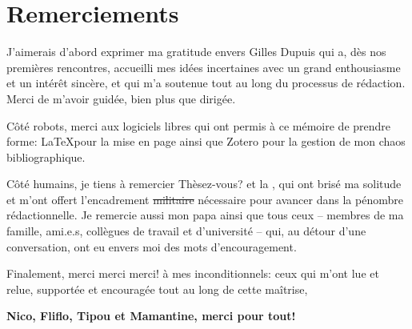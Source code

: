 \chapter*{Remerciements}
J'aimerais d'abord exprimer ma gratitude envers Gilles Dupuis qui a, dès nos premières rencontres, accueilli mes idées incertaines avec un grand enthousiasme et un intérêt sincère, et qui m'a soutenue tout au long du processus de rédaction. Merci de m'avoir guidée, bien plus que dirigée.
\par
Côté robots, merci aux logiciels libres qui ont permis à ce mémoire de prendre forme: \LaTeX pour la mise en page ainsi que Zotero pour la gestion de mon chaos bibliographique.
\par
Côté humains, je tiens à remercier Thèsez-vous? et la , qui ont brisé ma solitude et m'ont offert l'encadrement \sout{militaire} nécessaire pour avancer dans la pénombre rédactionnelle.
Je remercie aussi mon papa ainsi que tous ceux -- membres de ma famille, ami.e.s, collègues de travail et d'université -- qui, au détour d'une conversation, ont eu envers moi des mots d'encouragement.
\bigskip
\par
Finalement, merci merci merci! à mes inconditionnels: ceux qui m'ont lue et relue, supportée et encouragée tout au long de cette maîtrise,
\par
\textbf{Nico, Fliflo, Tipou et Mamantine, merci pour tout!}
